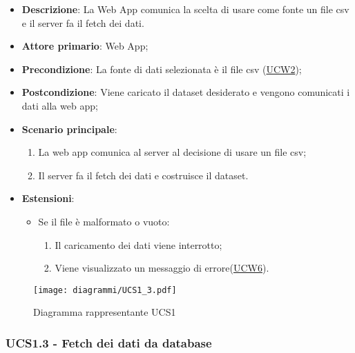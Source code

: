 \begin{itemize}

	\item \textbf{Descrizione}: La Web App comunica la scelta di usare come fonte un file csv e il server fa il fetch dei dati.

	\item \textbf{Attore primario}: Web App;

	\item \textbf{Precondizione}:   La fonte di dati selezionata è il file csv (\hyperref[sub:ucw2]{UCW2});

	\item \textbf{Postcondizione}:  Viene caricato il dataset desiderato  e vengono comunicati i dati alla web app;

	\item \textbf{Scenario principale}:
	      \begin{enumerate}
		      \item La web app comunica al server al decisione di usare un file csv;
		      \item Il server fa il fetch dei dati e costruisce il dataset.
	      \end{enumerate}

	\item \textbf{Estensioni}:
	      \begin{itemize}

		      \item Se il file è malformato o vuoto:
		            \begin{enumerate}

			            \item Il caricamento dei dati viene interrotto;
			            \item Viene visualizzato un messaggio di errore(\hyperref[sub:ucw6]{UCW6}).

		            \end{enumerate}

	      \end{itemize}

\end{itemize}

\begin{figure}[h]
	\centering
	\texttt{[image: diagrammi/UCS1\_3.pdf]}
	\caption{Diagramma rappresentante UCS1}
	\label{fig:UCS1_3}
\end{figure}

\subsubsection{UCS1.3 - Fetch dei dati da database}
\label{ssub:ucs1.3}

